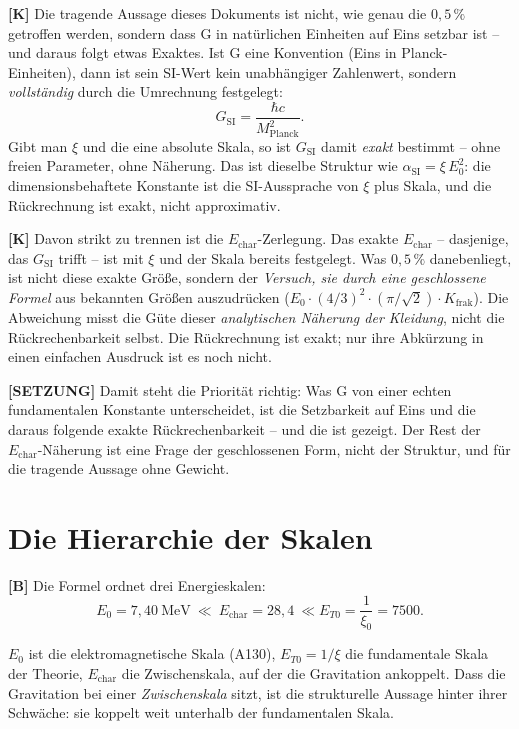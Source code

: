\textbf{[K]} Die tragende Aussage dieses Dokuments ist nicht, wie genau die
$0{,}5\,\%$ getroffen werden, sondern dass G in natürlichen Einheiten auf Eins
setzbar ist -- und daraus folgt etwas Exaktes. Ist G eine Konvention (Eins in
Planck-Einheiten), dann ist sein SI-Wert kein unabhängiger Zahlenwert, sondern
\emph{vollständig} durch die Umrechnung festgelegt:
\[
  G_\text{SI} = \frac{\hbar c}{M_\text{Planck}^2} .
\]
Gibt man $\xi$ und die eine absolute Skala, so ist $G_\text{SI}$ damit
\emph{exakt} bestimmt -- ohne freien Parameter, ohne Näherung. Das ist dieselbe
Struktur wie $\alpha_\text{SI} = \xi\,E_0^2$: die dimensionsbehaftete Konstante
ist die SI-Aussprache von $\xi$ plus Skala, und die Rückrechnung ist exakt, nicht
approximativ.

\textbf{[K]} Davon strikt zu trennen ist die $E_\text{char}$-Zerlegung. Das exakte
$E_\text{char}$ -- dasjenige, das $G_\text{SI}$ trifft -- ist mit $\xi$ und der
Skala bereits festgelegt. Was $0{,}5\,\%$ danebenliegt, ist nicht diese exakte
Größe, sondern der \emph{Versuch, sie durch eine geschlossene Formel} aus
bekannten Größen auszudrücken ($E_0\cdot(4/3)^2\cdot(\pi/\sqrt2)\cdot
K_\text{frak}$). Die Abweichung misst die Güte dieser \emph{analytischen
Näherung der Kleidung}, nicht die Rückrechenbarkeit selbst. Die Rückrechnung ist
exakt; nur ihre Abkürzung in einen einfachen Ausdruck ist es noch nicht.

\textbf{[SETZUNG]} Damit steht die Priorität richtig: Was G von einer echten
fundamentalen Konstante unterscheidet, ist die Setzbarkeit auf Eins und die
daraus folgende exakte Rückrechenbarkeit -- und die ist gezeigt. Der Rest der
$E_\text{char}$-Näherung ist eine Frage der geschlossenen Form, nicht der
Struktur, und für die tragende Aussage ohne Gewicht.

\section{Die Hierarchie der Skalen}

\textbf{[B]} Die Formel ordnet drei Energieskalen:
\[
  E_0 = 7{,}40\ \text{MeV}\ \ll\ E_\text{char} = 28{,}4\ \ll  E_{T0} = \frac{1}{\xi_0} = 7500 .
\]

$E_0$ ist die elektromagnetische Skala (A130), $E_{T0}=1/\xi$ die
fundamentale Skala der Theorie, $E_\text{char}$ die Zwischenskala, auf der die
Gravitation ankoppelt. Dass die Gravitation bei einer \emph{Zwischenskala}
sitzt, ist die strukturelle Aussage hinter ihrer Schwäche: sie koppelt weit
unterhalb der fundamentalen Skala.

